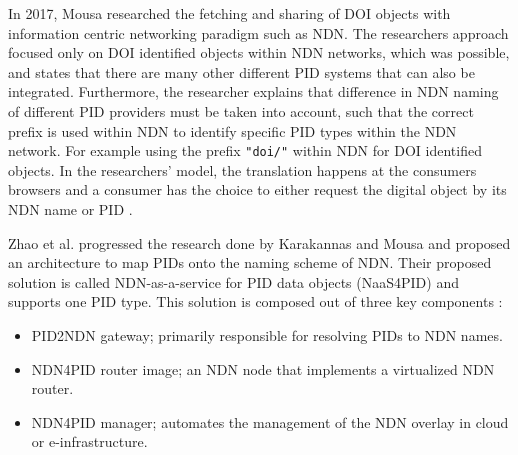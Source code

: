 In 2017, Mousa researched the fetching and sharing of DOI objects with information centric networking paradigm such as NDN. 
The researchers approach focused only on DOI identified objects within NDN networks, which was possible, and states that there are many other different PID systems that can also be integrated. Furthermore, the researcher explains that difference in NDN naming of different PID providers must be taken into account, such that the correct prefix is used within NDN to identify specific PID types within the NDN network. For example using the prefix \texttt{"doi/"} within NDN for DOI identified objects. 
In the researchers' model, the translation happens at the consumers browsers and a consumer has the choice to either request the digital object by its NDN name or PID \cite{ndn-app-aware}.

Zhao et al. progressed the research done by Karakannas and Mousa and proposed an architecture to map PIDs onto the naming scheme of NDN. Their proposed solution is called NDN-as-a-service for PID data objects (NaaS4PID) and supports one PID type. This solution is composed out of three key components \cite{icn-resteam}:
\begin{itemize}
  \item PID2NDN gateway; primarily responsible for resolving PIDs to NDN names.
  \item NDN4PID router image; an NDN node that implements a virtualized NDN router.
  \item NDN4PID manager; automates the management of the NDN overlay in cloud or e-infrastructure.
\end{itemize}

